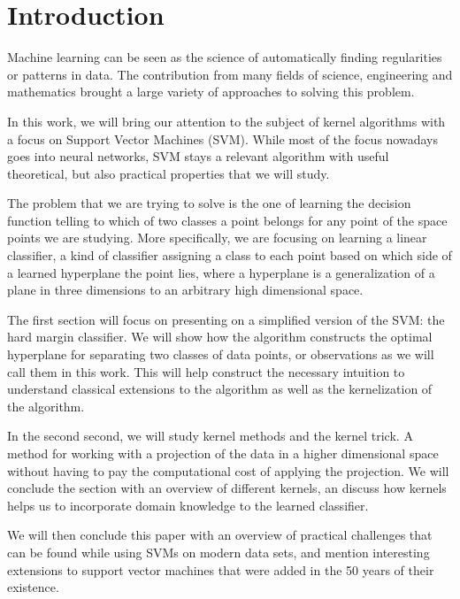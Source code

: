 \section{Introduction}

Machine learning can be seen as the science of automatically finding regularities or patterns in data. The contribution from many fields of science, engineering and mathematics brought a large variety of approaches to solving this problem.

In this work, we will bring our attention to the subject of kernel algorithms with a focus on Support Vector Machines (SVM). While most of the focus nowadays goes into neural networks, SVM stays a relevant algorithm with useful theoretical, but also practical properties that we will study.

The problem that we are trying to solve is the one of learning the decision function telling to which of two classes a point belongs for any point of the space points we are studying. More specifically, we are focusing on learning a linear classifier, a kind of classifier assigning a class to each point based on which side of a learned hyperplane the point lies, where a hyperplane is a generalization of a plane in three dimensions to an arbitrary high dimensional space.

The first section will focus on presenting on a simplified version of the SVM: the hard margin classifier. We will show how the algorithm constructs the optimal hyperplane for separating two classes of data points, or observations as we will call them in this work. This will help construct the necessary intuition to understand classical extensions to the algorithm as well as the kernelization of the algorithm.

In the second second, we will study kernel methods and the kernel trick. A method for working with a projection of the data in a higher dimensional space without having to pay the computational cost of applying the projection. We will conclude the section with an overview of different kernels, an discuss how kernels helps us to incorporate domain knowledge to the learned classifier.

We will then conclude this paper with an overview of practical challenges that can be found while using SVMs on modern data sets, and mention interesting extensions to support vector machines that were added in the 50 years of their existence.

